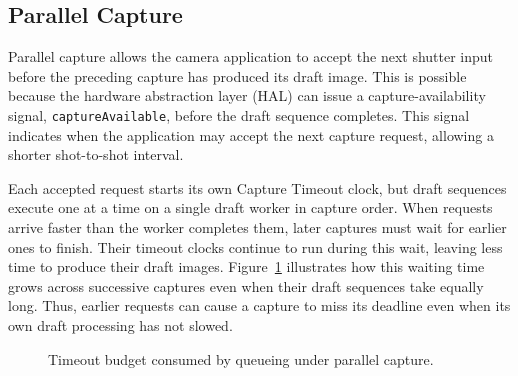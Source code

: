 \subsection{Parallel Capture}
\label{sec:parallel-capture}

Parallel capture allows the camera application to accept the next shutter input before the preceding capture has produced its draft image.
This is possible because the hardware abstraction layer (HAL) can issue a capture-availability signal, \texttt{captureAvailable}, before the draft sequence completes.
This signal indicates when the application may accept the next capture request, allowing a shorter shot-to-shot interval.

Each accepted request starts its own Capture Timeout clock, but draft sequences execute one at a time on a single draft worker in capture order.
When requests arrive faster than the worker completes them, later captures must wait for earlier ones to finish.
Their timeout clocks continue to run during this wait, leaving less time to produce their draft images.
Figure~\ref{fig:overlap} illustrates how this waiting time grows across successive captures even when their draft sequences take equally long.
Thus, earlier requests can cause a capture to miss its deadline even when its own draft processing has not slowed.

\begin{figure}[t]
  \centering
  \resizebox{\columnwidth}{!}{}
  \caption{Timeout budget consumed by queueing under parallel capture.}
  \label{fig:overlap}
\end{figure}
